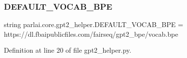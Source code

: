 \subsubsection{\texorpdfstring{D\+E\+F\+A\+U\+L\+T\+\_\+\+V\+O\+C\+A\+B\+\_\+\+B\+PE}{DEFAULT\_VOCAB\_BPE}}
{\footnotesize\ttfamily string parlai.\+core.\+gpt2\+\_\+helper.\+D\+E\+F\+A\+U\+L\+T\+\_\+\+V\+O\+C\+A\+B\+\_\+\+B\+PE = \textquotesingle{}https\+://dl.\+fbaipublicfiles.\+com/fairseq/gpt2\+\_\+bpe/vocab.\+bpe\textquotesingle{}}



Definition at line 20 of file gpt2\+\_\+helper.\+py.

